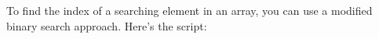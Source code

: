 \documentclass[preview]{standalone}
\begin{document}
To find the index of a searching element in an array, you can use a modified binary search approach. Here's the script:\\
\end{document}

